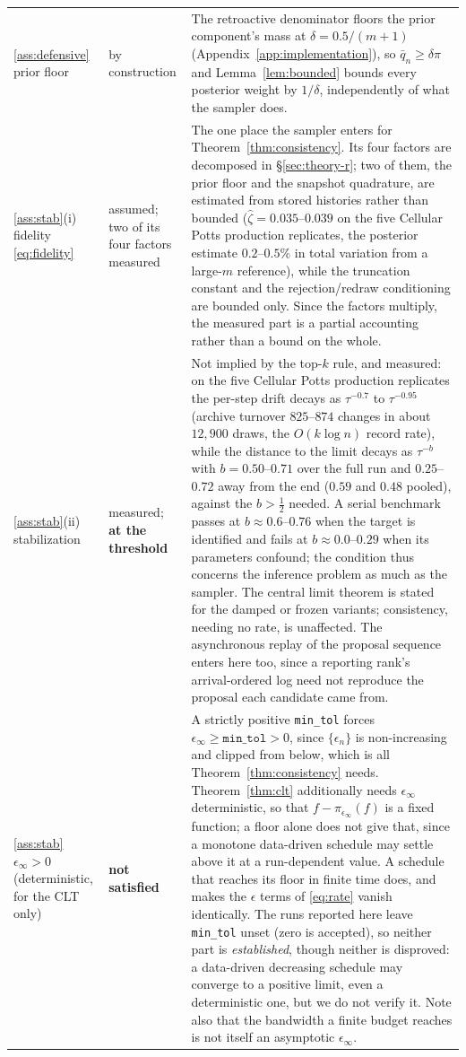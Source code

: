 \documentclass[pdflatex,sn-mathphys-num]{sn-jnl}
\theoremstyle{plain}
\theoremstyle{definition}
\begin{document}
\begin{appendices}
\begin{table}[h]
\begin{tabular}{@{}p{}p{}p{}@{}}
\ref{ass:defensive} prior floor & by construction & The retroactive denominator floors the prior component's mass at $\delta=0.5/(m{+}1)$ (Appendix~\ref{app:implementation}), so $\bar q_n\ge\delta\pi$ and Lemma~\ref{lem:bounded} bounds every posterior weight by $1/\delta$, independently of what the sampler does. \\
\ref{ass:stab}(i) fidelity \eqref{eq:fidelity} & assumed; two of its four factors measured & The one place the sampler enters for Theorem~\ref{thm:consistency}. Its four factors are decomposed in \S\ref{sec:theory-r}; two of them, the prior floor and the snapshot quadrature, are estimated from stored histories rather than bounded ($\widehat\zeta=0.035$--$0.039$ on the five Cellular Potts production replicates, the posterior estimate $0.2$--$0.5\%$ in total variation from a large-$m$ reference), while the truncation constant and the rejection/redraw conditioning are bounded only. Since the factors multiply, the measured part is a partial accounting rather than a bound on the whole. \\
\ref{ass:stab}(ii) stabilization & measured; \textbf{at the threshold} & Not implied by the top-$k$ rule, and measured: on the five Cellular Potts production replicates the per-step drift decays as $\tau^{-0.7}$ to $\tau^{-0.95}$ (archive turnover $825$--$874$ changes in about $12{,}900$ draws, the $O(k\log n)$ record rate), while the distance to the limit decays as $\tau^{-b}$ with $b=0.50$--$0.71$ over the full run and $0.25$--$0.72$ away from the end ($0.59$ and $0.48$ pooled), against the $b>\tfrac12$ needed. A serial benchmark passes at $b\approx0.6$--$0.76$ when the target is identified and fails at $b\approx0.0$--$0.29$ when its parameters confound; the condition thus concerns the inference problem as much as the sampler. The central limit theorem is stated for the damped or frozen variants; consistency, needing no rate, is unaffected. The asynchronous replay of the proposal sequence enters here too, since a reporting rank's arrival-ordered log need not reproduce the proposal each candidate came from. \\
\ref{ass:stab} $\epsilon_\infty>0$ (deterministic, for the CLT only) & \textbf{not satisfied} & A strictly positive \texttt{min\_tol} forces $\epsilon_\infty\ge\texttt{min\_tol}>0$, since $\{\epsilon_n\}$ is non-increasing and clipped from below, which is all Theorem~\ref{thm:consistency} needs. Theorem~\ref{thm:clt} additionally needs $\epsilon_\infty$ deterministic, so that $f-\pi_{\epsilon_\infty}(f)$ is a fixed function; a floor alone does not give that, since a monotone data-driven schedule may settle above it at a run-dependent value. A schedule that reaches its floor in finite time does, and makes the $\epsilon$ terms of \eqref{eq:rate} vanish identically. The runs reported here leave \texttt{min\_tol} unset (zero is accepted), so neither part is \emph{established}, though neither is disproved: a data-driven decreasing schedule may converge to a positive limit, even a deterministic one, but we do not verify it. Note also that the bandwidth a finite budget reaches is not itself an asymptotic $\epsilon_\infty$. \\

\end{tabular}
\end{table}
\end{appendices}
\end{document}
